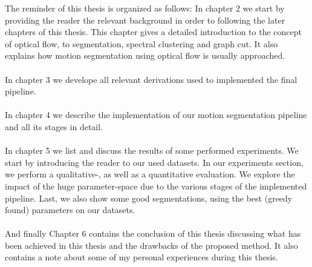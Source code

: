 The reminder of this thesis is organized as follows:
In chapter 2 we start by providing the reader the relevant background in order to following the later chapters of this thesis. This chapter gives a detailed introduction to the concept of optical flow, to segmentation, spectral clustering and graph cut. It also explains how motion segmentation using optical flow is usually approached. \\ \\
In chapter 3 we develope all relevant derivations used to implemented the final pipeline. \\ \\
In chapter 4 we describe the implementation of our motion segmentation pipeline and all its stages in detail. \\ \\
In chapter 5 we list and discuss the results of some performed experiments. We start by introducing the reader to our used datasets. In our experiments section, we perform a qualitative-, as well as a quantitative evaluation. We explore the impact of the huge parameter-space due to the various stages of the implemented pipeline. Last, we also show some good segmentations, using the best (greedy found) parameters on our datasets. \\ \\
And finally Chapter 6 contains the conclusion of this thesis discussing what has been achieved in this thesis and the drawbacks of the proposed method. It also contains a note about some of my personal experiences during this thesis. 